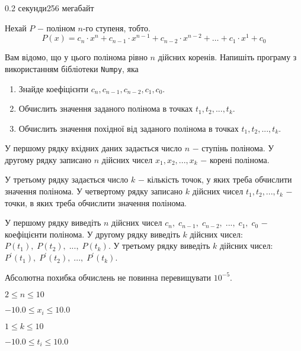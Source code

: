 \begin{problem}{}{}{}{0.2 секунди}{256 мегабайт}


Нехай $P$ $-$ поліном $n$-го ступеня, тобто.
$$
  P(x) = c_n \cdot x^n + c_{n-1} \cdot x^{n-1} + c_{n-2} \cdot x^{n-2} + \dots + c_{1} \cdot x^{1} + c_{0} 
$$


Вам відомо, що у цього полінома рівно $n$ дійсних коренів.
Напишіть програму з використанням бібліотеки \texttt{Numpy}, яка
\begin{enumerate}
 \item Знайде коефіцієнти $c_n, c_{n-1}, c_{n-2}, c_{1}, c_{0}$.
 \item Обчислить значення заданого полінома в точках $t_1, t_2, ..., t_k$.
 \item Обчислить значення похідної від заданого полінома в точках $t_1, t_2, ..., t_k$.
\end{enumerate}




\InputFile
У першому рядку вхідних даних задається число $n$ $-$ ступінь полінома.
У другому рядку записано $n$ дійсних чисел $x_1, x_2, ..., x_k$ $-$ корені полінома.


У третьому рядку задається число $k$ $-$ кількість точок, у яких треба обчислити значення полінома.
У четвертому рядку записано $k$ дійсних чисел $t_1, t_2, ..., t_k$ $-$ точки, в яких треба обчислити значення полінома.


\OutputFile
У першому рядку виведіть $n$ дійсних чисел $c_n,\; c_{n-1}, \; c_{n-2}, \; ..., \; c_{1}, \; c_{0}$ $-$ коефіцієнти полінома.
У другому рядку виведіть $k$ дійсних чисел: $P(t_1), \; P(t_2),\; ...,\; P(t_k)$.
У третьому рядку виведіть $k$ дійсних чисел: $P^\prime(t_1),\; P^\prime(t_2),\; ..., \; P^\prime(t_k)$.


Абсолютна похибка обчислень не повинна перевищувати $10^{-5}$.


\Constraints
$2 \le n \le 10$

$-10.0 \le x_i \le 10.0$

$1 \le k \le 10$

$-10.0 \le t_i \le 10.0$

\Examples
\begin{example}
%
%
\end{example}

\end{problem}

